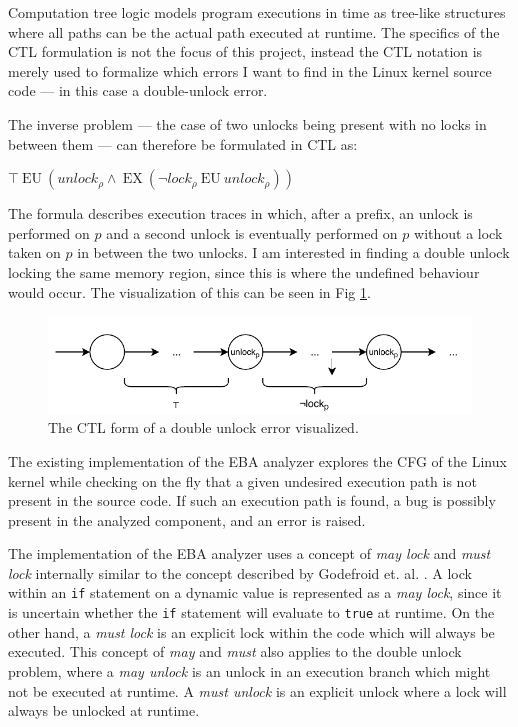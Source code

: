 \newpar Computation tree logic models program executions in time as tree-like structures where all paths can be the actual path executed at runtime. The specifics of the CTL formulation is not the focus of this project, instead the CTL notation is merely used to formalize which errors I want to find in the Linux kernel source code --- in this case a double-unlock error.

\newpar The inverse problem --- the case of two unlocks being present with no locks in between them --- can therefore be formulated in CTL as: 

\begin{center}
    $\top\:\mathrm{EU}\:\left({u n l o c k}_{\rho} \wedge\:\mathrm{EX}\:\left(\neg {l o c k}_{\rho}\:\mathrm{EU}\:{u n l o c k}_{\rho}\right)\right)$
\end{center}

\newpar The formula describes execution traces in which, after a prefix, an unlock is performed on $p$ and a second unlock is eventually performed on $p$ without a lock taken on $p$ in between the two unlocks. I am interested in finding a double unlock locking the same memory region, since this is where the undefined behaviour would occur. The visualization of this can be seen in Fig \ref{fig:doubleunlock}.

\begin{figure}[h]
    \centering
    \includegraphics{background/figures/doubleunlock}
    \caption{The CTL form of a double unlock error visualized.}
    \label{fig:doubleunlock}
\end{figure}

\newpar The existing implementation of the EBA analyzer explores the CFG of the Linux kernel while checking on the fly that a given undesired execution path is not present in the source code. If such an execution path is found, a bug is possibly present in the analyzed component, and an error is raised.

\newpar The implementation of the EBA analyzer uses a concept of \textit{may lock} and \textit{must lock} internally similar to the concept described by Godefroid et. al. \cite{Godefroid}. A lock within an \texttt{if} statement on a dynamic value is represented as a \textit{may lock}, since it is uncertain whether the \texttt{if} statement will evaluate to \texttt{true} at runtime. On the other hand, a \textit{must lock} is an explicit lock within the code which will always be executed. This concept of \textit{may} and \textit{must} also applies to the double unlock problem, where a \textit{may unlock} is an unlock in an execution branch which might not be executed at runtime. A \textit{must unlock} is an explicit unlock where a lock will always be unlocked at runtime.

